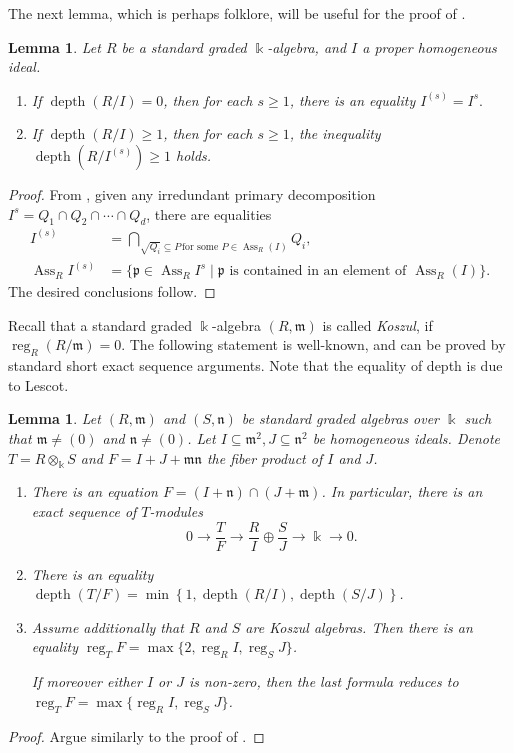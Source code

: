 \documentclass{amsart}
\DeclareMathOperator{\Ass}{Ass}
\DeclareMathOperator{\depth}{depth}
\DeclareMathOperator{\reg}{reg}
\newcommand{\mm}{\mathfrak{m}}
\newcommand{\nn}{\mathfrak{n}}
\newcommand{\pp}{\mathfrak{p}}
\theoremstyle{plain}
\newtheorem{lem}[thm]{Lemma}
\theoremstyle{definition}
\numberwithin{equation}{section}
\newcommand{\kk}{\Bbbk}
\begin{document}
The next lemma, which is perhaps folklore, will be useful for the proof of . 
\begin{lem}
\label{lem_positivedepth_symbpow}
Let $R$ be a standard graded $\kk$-algebra, and $I$ a proper homogeneous ideal. 
\begin{enumerate}[\quad \rm (i)]
\item If $\depth(R/I)=0$, then for each $s\ge 1$, there is an equality 
$I^{(s)}=I^s.$
\item If $\depth(R/I)\ge 1$, then for each $s\ge 1$, the inequality
$\depth(R/I^{(s)})\ge 1$ holds.
\end{enumerate}
\end{lem}
\begin{proof}
From \cite[Lemma 2.2]{HJKN}, given any irredundant primary decomposition $I^s=Q_1\cap Q_2\cap \cdots \cap Q_d$, there are equalities
\begin{align*}
I^{(s)} &= \bigcap_{\sqrt{Q_i}\subseteq P \, \text{for some $P\in \Ass_R(I)$}}Q_i,\\
\Ass_R I^{(s)}&=\{\pp \in \Ass_R I^s \mid \text{$\pp$ is contained in an element of $\Ass_R(I)$}\}. 
\end{align*}
The desired conclusions follow.
\end{proof}
Recall that a standard graded $\kk$-algebra $(R,\mm)$ is called \emph{Koszul}, if $\reg_R(R/\mm)=0$. The following statement is well-known, and can be proved by standard short exact sequence arguments. Note that the equality of depth is due to Lescot. 
\begin{lem}
\label{lem_decomposition_F}
Let $(R,\mm)$ and $(S,\nn)$ be standard graded algebras over $\kk$ such that $\mm\neq (0)$ and $\nn\neq (0)$. Let $I\subseteq \mm^2, J\subseteq \nn^2$ be homogeneous ideals. Denote $T=R\otimes_\kk S$ and $F=I+J+\mm\nn$ the fiber product of $I$ and $J$.
\begin{enumerate}[\quad \rm (i)]
 \item There is an equation $F=(I+\nn)\cap (J+\mm)$. In particular, there is an exact sequence of $T$-modules
\[
0\to \frac{T}{F} \to \frac{R}{I} \oplus \frac{S}{J} \to \kk \to 0.
\]
\item There is an equality $\depth(T/F) = \min\left\{1, \depth(R/I), \depth(S/J)\right\}$.
\item Assume additionally that $R$ and $S$ are Koszul algebras. Then there is an equality
$\reg_T F  =\max\{2, \reg_R I, \reg_S J\}$.

If moreover either $I$ or $J$ is non-zero, then the last formula reduces to
$\reg_T F=\max\{\reg_R I, \reg_S J\}$.
\end{enumerate}
\end{lem}
\begin{proof}
Argue similarly to the proof of \cite[Proposition 3.3]{NgV19b}.
\end{proof}
\end{document}
